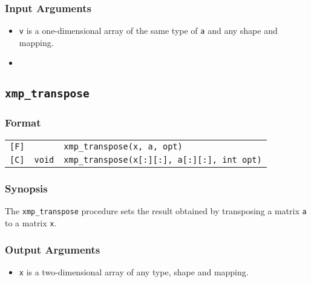 \subsubsection*{Input Arguments}
\begin{itemize}
 \item {\tt v} is a one-dimensional array of the same type of {\tt a}
       and any shape and mapping.
 \item {}
\end{itemize}


\subsection{\tt xmp\_transpose}

\subsubsection*{Format}

\begin{tabular}{lll}

\verb![F]!&            & {\tt xmp\_transpose(x, a, opt)}\\

\verb![C]!& {\tt void} & {\tt xmp\_transpose(x[:][:], a[:][:], int opt)}\\

\end{tabular}

\subsubsection*{Synopsis}

The {\tt xmp\_transpose} procedure sets the result obtained by
transposing a matrix {\tt a} to a matrix {\tt x}.

\subsubsection*{Output Arguments}
\begin{itemize}
 \item {\tt x} is a two-dimensional array of any type, shape and mapping.
\end{itemize}

